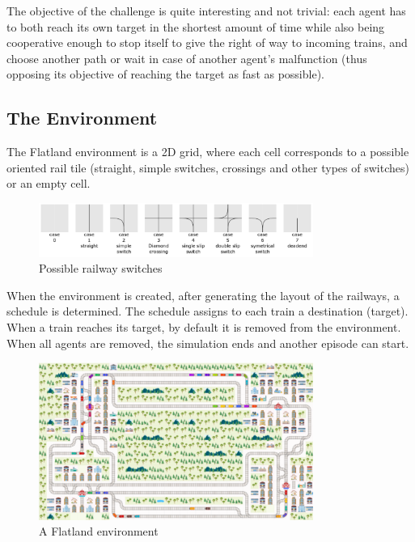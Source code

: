 \documentclass[13pt]{article}
\begin{document}
The objective of the challenge is quite interesting and not trivial: each agent has to both reach its own target in the shortest amount of time while also being cooperative enough to stop itself to give the right of way to incoming trains, and choose another path or wait in case of another agent's malfunction (thus opposing its objective of reaching the target as fast as possible).

\subsection{The Environment}
The Flatland environment is a 2D grid, where each cell corresponds to a possible oriented rail tile (straight, simple switches, crossings and other types of switches) or an empty cell.

\begin{figure}[h]
    \centering
    \includegraphics[width=0.8\textwidth]{assets/Flatland/switches.png}
    \caption{Possible railway switches}
    \label{fig:switches}
\end{figure}

When the environment is created, after generating the layout of the railways, a schedule is determined. The schedule assigns to each train a destination (target). When a train reaches its target, by default it is removed from the environment. When all agents are removed, the simulation ends and another episode can start.

\begin{figure}[h]
    \centering
    \includegraphics[width=0.8\textwidth]{assets/Flatland/env.png}
    \caption{A Flatland environment}
    \label{fig:env}
\end{figure}
\end{document}
